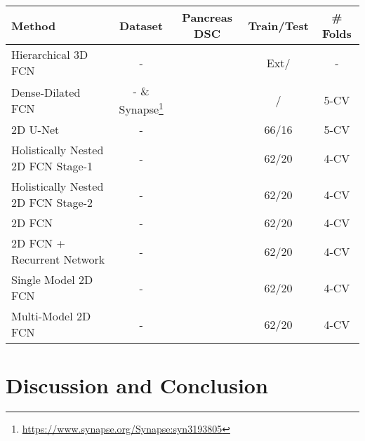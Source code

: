\documentclass{article}
\begin{document}
\begin{table}\footnotesize
	\parbox{\textwidth}{
		\centering
		\label{tab:state_of_the_art_methods}
		\vspace{1 mm}
		\begin{tabular}{@{\extracolsep{1pt}}lcccc@{}} 
			Method  & Dataset & Pancreas DSC & Train/Test & \# Folds \\ \midrule
			
			Hierarchical 3D FCN \cite{roth2017hierarchical} & - &  & Ext/ & -\\
			
			Dense-Dilated FCN \cite{gibson2017towards} & - \& Synapse\footnote{\url{https://www.synapse.org/Synapse:syn3193805}} &  & / & 5-CV\\
			
			2D U-Net \cite{heinrich2018ternarynet} & - &  & 66/16 & 5-CV\\ 
			
			Holistically Nested 2D FCN Stage-1\cite{roth2018media} & - &  & 62/20& 4-CV\\
			
			Holistically Nested 2D FCN Stage-2\cite{roth2018media} & - &  & 62/20& 4-CV\\
			
			2D FCN \cite{cai2017improving} & - &  & 62/20 & 4-CV\\
			
			2D FCN + Recurrent Network \cite{cai2017improving} & - &  & 62/20 & 4-CV\\
			
			Single Model 2D FCN \cite{zhou2017fixed} & - &  & 62/20 & 4-CV\\
			
			Multi-Model 2D FCN \cite{zhou2017fixed} & - &  & 62/20 & 4-CV\\
			
			\midrule
		\end{tabular}
	}
\end{table}

\section{Discussion and Conclusion}
\end{document}

